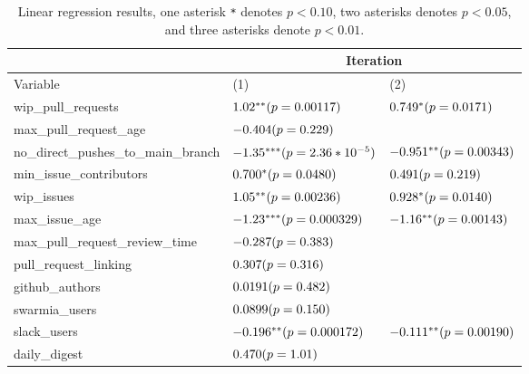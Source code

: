 \renewcommand{\arraystretch}{1.5}
\begin{table}[h!]
\begin{center}
\begin{tabular}{|p{7cm}|p{3cm}|p{3cm}| } 
\cline{2-3}
& \multicolumn{2}{|c|}{Iteration}\\
\hline

Variable & (1) & (2) \\ [0.5ex]
\hline\hline


wip\_pull\_requests & $1.02^{**} \newline (p=0.00117)$ & $0.749^{*} \newline (p=0.0171)$\\
max\_pull\_request\_age & $-0.404 \newline (p=0.229)$ & \\
no\_direct\_pushes\_to\_main\_branch & $-1.35^{***} \newline (p=2.36*10^{-5})$ & $-0.951^{**} \newline (p=0.00343)$\\
min\_issue\_contributors  & $0.700^* \newline (p=0.0480)$ & $0.491 \newline (p=0.219)$\\
wip\_issues & $1.05^{**} \newline (p=0.00236)$ & $0.928^{*} \newline (p=0.0140)$\\
max\_issue\_age  & $-1.23^{***} \newline (p=0.000329)$ & $-1.16^{**} \newline (p=0.00143)$\\
max\_pull\_request\_review\_time  & $-0.287 \newline (p=0.383)$ & \\
pull\_request\_linking  & $0.307 \newline (p=0.316)$ & \\
github\_authors  & $0.0191 \newline (p=0.482)$ & \\
swarmia\_users & $0.0899 \newline (p=0.150)$ & \\
slack\_users & $-0.196^{**} \newline (p=0.000172)$ & $-0.111^{**} \newline (p=0.00190)$\\
daily\_digest & $0.470 \newline (p=1.01)$ & \\

\hline
\end{tabular}
\caption{Linear regression results, one asterisk \texttt{*} denotes  $p < 0.10$, two asterisks denotes $p < 0.05$, and three asterisks denote $p < 0.01$.}
\label{tab:lmResults}
\end{center}
\end{table}